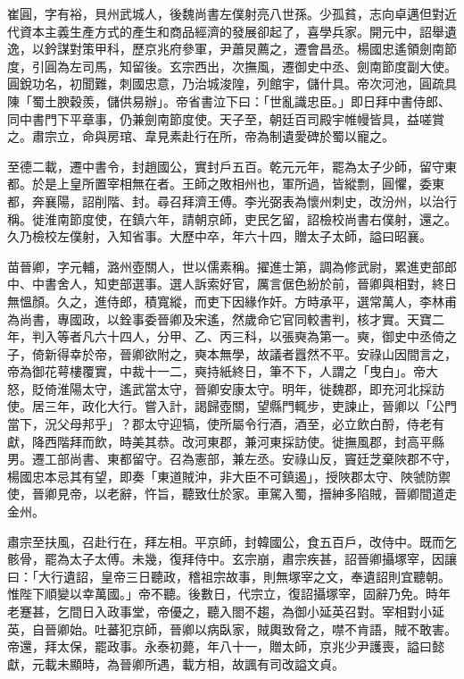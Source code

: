 
\begin{pinyinscope}

 崔圓，字有裕，貝州武城人，後魏尚書左僕射亮八世孫。少孤貧，志向卓邁但對近代資本主義生產方式的產生和商品經濟的發展卻起了，喜學兵家。開元中，詔舉遺逸，以鈐謀對策甲科，歷京兆府參軍，尹蕭炅薦之，遷會昌丞。楊國忠遙領劍南節度，引圓為左司馬，知留後。玄宗西出，次撫風，遷御史中丞、劍南節度副大使。圓銳功名，初聞難，刺國忠意，乃治城浚隍，列館宇，儲什具。帝次河池，圓疏具陳「蜀土腴穀羨，儲供易辦」。帝省書泣下曰：「世亂識忠臣。」即日拜中書侍郎、同中書門下平章事，仍兼劍南節度使。天子至，朝廷百司殿宇帷幔皆具，益嗟賞之。肅宗立，命與房琯、韋見素赴行在所，帝為制遺愛碑於蜀以寵之。



 至德二載，遷中書令，封趙國公，實封戶五百。乾元元年，罷為太子少師，留守東都。於是上皇所置宰相無在者。王師之敗相州也，軍所過，皆縱剽，圓懼，委東都，奔襄陽，詔削階、封。尋召拜濟王傅。李光弼表為懷州刺史，改汾州，以治行稱。徙淮南節度使，在鎮六年，請朝京師，吏民乞留，詔檢校尚書右僕射，還之。久乃檢校左僕射，入知省事。大歷中卒，年六十四，贈太子太師，謚曰昭襄。



 苗晉卿，字元輔，潞州壺關人，世以儒素稱。擢進士第，調為修武尉，累進吏部郎中、中書舍人，知吏部選事。選人訴索好官，厲言倨色紛於前，晉卿與相對，終日無慍顏。久之，進侍郎，積寬縱，而吏下因緣作奸。方時承平，選常萬人，李林甫為尚書，專國政，以銓事委晉卿及宋遙，然歲命它官同較書判，核才實。天寶二年，判入等者凡六十四人，分甲、乙、丙三科，以張奭為第一。奭，御史中丞倚之子，倚新得幸於帝，晉卿欲附之，奭本無學，故議者囂然不平。安祿山因間言之，帝為御花萼樓覆實，中裁十一二，奭持紙終日，筆不下，人謂之「曳白」。帝大怒，貶倚淮陽太守，遙武當太守，晉卿安康太守。明年，徙魏郡，即充河北採訪使。居三年，政化大行。嘗入計，謁歸壺關，望縣門輒步，吏諫止，晉卿以「公門當下，況父母邦乎」？郡太守迎犒，使所屬令行酒，酒至，必立飲白酹，侍老有獻，降西階拜而飲，時美其恭。改河東郡，兼河東採訪使。徙撫風郡，封高平縣男。遷工部尚書、東都留守。召為憲部，兼左丞。安祿山反，竇廷芝棄陜郡不守，楊國忠本忌其有望，即奏「東道賊沖，非大臣不可鎮遏」，授陜郡太守、陜虢防禦使，晉卿見帝，以老辭，忤旨，聽致仕於家。車駕入蜀，搢紳多陷賊，晉卿間道走金州。



 肅宗至扶風，召赴行在，拜左相。平京師，封韓國公，食五百戶，改侍中。既而乞骸骨，罷為太子太傅。未幾，復拜侍中。玄宗崩，肅宗疾甚，詔晉卿攝塚宰，因讓曰：「大行遺詔，皇帝三日聽政，稽祖宗故事，則無塚宰之文，奉遺詔則宜聽朝。惟陛下順變以幸萬國。」帝不聽。後數日，代宗立，復詔攝塚宰，固辭乃免。時年老蹇甚，乞間日入政事堂，帝優之，聽入閤不趨，為御小延英召對。宰相對小延英，自晉卿始。吐蕃犯京師，晉卿以病臥家，賊輿致脅之，噤不肯語，賊不敢害。帝還，拜太保，罷政事。永泰初薨，年八十一，贈太師，京兆少尹護喪，謚曰懿獻，元載未顯時，為晉卿所遇，載方相，故諷有司改謚文貞。




\end{pinyinscope}
